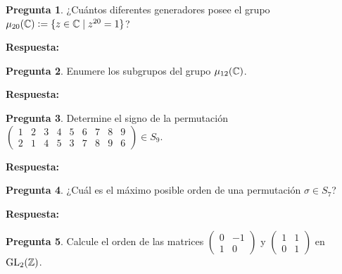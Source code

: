 \documentclass{article}
\theoremstyle{definition}
\newtheorem{pregunta}{Pregunta}
\begin{document}
\begin{pregunta}
  ¿Cuántos diferentes generadores posee el grupo
  $\mu_{20} (\mathbb{C}) \mathrel{\mathop:}= \{ z \in \mathbb{C} \mid z^{20} = 1 \}$?
\end{pregunta}

\noindent\textbf{Respuesta:}

\vspace{3em}

\begin{pregunta}
  Enumere los subgrupos del grupo $\mu_{12} (\mathbb{C})$.
\end{pregunta}

\begin{framed}
  \noindent\textbf{Respuesta:}

  \vspace{5cm}
\end{framed}

\vspace{3em}

\begin{pregunta}
  Determine el signo de la permutación $\begin{pmatrix}
    1 & 2 & 3 & 4 & 5 & 6 & 7 & 8 & 9 \\
    2 & 1 & 4 & 5 & 3 & 7 & 8 & 9 & 6
  \end{pmatrix} \in S_9$.
\end{pregunta}

\noindent\textbf{Respuesta:}

\vspace{3em}

\begin{pregunta}
  ¿Cuál es el máximo posible orden de una permutación $\sigma \in S_7$?
\end{pregunta}

\noindent\textbf{Respuesta:}

\pagebreak

\begin{pregunta}
  Calcule el orden de las matrices
  $\begin{pmatrix} 0 & -1 \\ 1 & 0\end{pmatrix}$ y
  $\begin{pmatrix} 1 & 1 \\ 0 & 1\end{pmatrix}$ en $\operatorname{GL}_2 (\mathbb{Z})$.
\end{pregunta}
\end{document}
